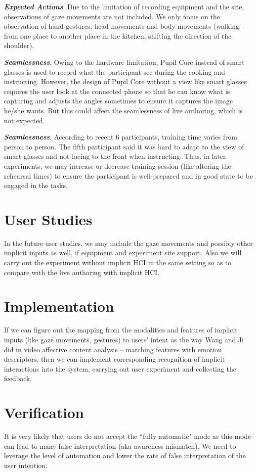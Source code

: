 \documentclass[fyp]{socreport}
\begin{document}
\textit{\textbf{Expected Actions}}. Due to the limitation of recording equipment and the site, observations of gaze movements are not included. We only focus on the observation of hand gestures, head movements and body movements (walking from one place to another place in the kitchen, shifting the direction of the shoulder).

\textit{\textbf{Seamlessness}}. Owing to the hardware limitation, Pupil Core instead of smart glasses is used to record what the participant see during the cooking and instructing. However, the design of Pupil Core without a view like smart glasses requires the user look at the connected phone so that he can know what is capturing and adjusts the angles sometimes to ensure it captures the image he/she wants. But this could affect the seamlessness of live authoring, which is not expected.

\textit{\textbf{Seamlessness}}. According to recent 6 participants, training time varies from person to person. The fifth participant said it was hard to adapt to the view of smart glasses and not facing to the front when instructing. Thus, in later experiments, we may increase or decrease training session (like altering the rehearsal times) to ensure the participant is well-prepared and in good state to be engaged in the tasks.

\section{User Studies}
In the future user studies, we may include the gaze movements and possibly other implicit inputs as well, if equipment and experiment site support. Also we will carry out the experiment without implicit HCI in the same setting so as to compare with the live authoring with implicit HCI.

\section{Implementation}
If we can figure out the mapping from the modalities and features of implicit inputs (like gaze movements, gestures) to users' intent as the way Wang and Ji \cite{wang2015video} did in video affective content analysis -- matching features with emotion descriptors, then we can implement corresponding recognition of implicit interactions into the system, carrying out user experiment and collecting the feedback.

\section{Verification}
It is very likely that users do not accept the ``fully automatic" mode as this mode can lead to many false interpretation (aka awareness mismatch). We need to leverage the level of automation and lower the rate of false interpretation of the user intention.



\end{document}
